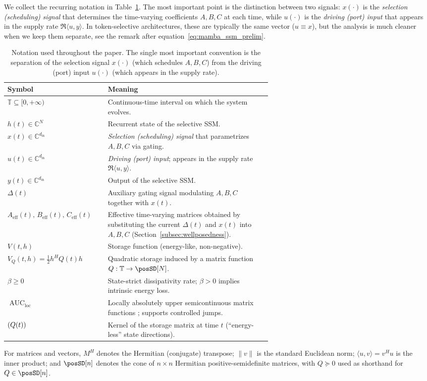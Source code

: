 \documentclass[10pt]{article} %
\def\eqref#1{equation~\ref{#1}}
\newcommand{\timeInt}{\mathbb T}                        %
\newcommand{\loc}{\mathrm{loc}}                         %
\let\ker\relax\DeclareMathOperator{\ker}{Ker}           %
\DeclareMathOperator{\AUC}{AUC}                         %
\theoremstyle{definition}
\begin{document}
We collect the recurring notation in Table~\ref{tab:notation}. The most important point is the distinction between two signals: $x(\cdot)$ is the \emph{selection (scheduling) signal} that determines the time-varying coefficients $A,B,C$ at each time, while $u(\cdot)$ is the \emph{driving (port) input} that appears in the supply rate $\Re\langle u, y\rangle$. In token-selective architectures, these are typically the same vector ($u\equiv x$), but the analysis is much cleaner when we keep them separate, see the remark after \eqref{eq:mamba_ssm_prelim}.
\begin{table}[h]
\centering
\small
\begin{tabular}{l p{0.62\linewidth}}
\toprule
\textbf{Symbol} & \textbf{Meaning}\\
\midrule
$\timeInt\subseteq[0,+\infty)$ & Continuous-time interval on which the system evolves.\\
$h(t)\in\mathbb{C}^N$ & Recurrent state of the selective SSM.\\
$x(t)\in\mathbb{C}^{d_{\mathrm{in}}}$ & \emph{Selection (scheduling) signal} that parametrizes $A,B,C$ via gating.\\
$u(t)\in\mathbb{C}^{d_{\mathrm{in}}}$ & \emph{Driving (port) input}; appears in the supply rate $\Re\langle u, y\rangle$.\\
$y(t)\in\mathbb{C}^{d_{\mathrm{in}}}$ & Output of the selective SSM.\\
$\Delta(t)$ & Auxiliary gating signal modulating $A,B,C$ together with $x(t)$.\\
$A_{\mathrm{eff}}(t),\,B_{\mathrm{eff}}(t),\,C_{\mathrm{eff}}(t)$ & Effective time-varying matrices obtained by substituting the current $\Delta(t)$ and $x(t)$ into $A,B,C$ (Section~\ref{subsec:wellposedness}).\\
$V(t,h)$ & Storage function (energy-like, non-negative).\\
$V_Q(t,h)=\tfrac12 h^H Q(t)h$ & Quadratic storage induced by a matrix function $Q:\timeInt\to\posSD[N]$.\\
$\beta\ge 0$ & State-strict dissipativity rate; $\beta>0$ implies intrinsic energy loss.\\
$\AUC_{\loc}$ & Locally absolutely upper semicontinuous matrix functions \citep{MorandinHinsen2024}; supports controlled jumps.\\
$\ker(Q(t))$ & Kernel of the storage matrix at time $t$ (``energy-less'' state directions).\\
\bottomrule
\end{tabular}
\caption{Notation used throughout the paper. The single most important convention is the separation of the selection signal $x(\cdot)$ (which schedules $A,B,C$) from the driving (port) input $u(\cdot)$ (which appears in the supply rate).}
\label{tab:notation}
\end{table}
For matrices and vectors, $M^H$ denotes the Hermitian (conjugate) transpose; $\|v\|$ is the standard Euclidean norm; $\langle u,v\rangle = v^H u$ is the inner product; and $\posSD[n]$ denotes the cone of $n\times n$ Hermitian positive-semidefinite matrices, with $Q\succeq 0$ used as shorthand for $Q\in\posSD[n]$.
\end{document}
